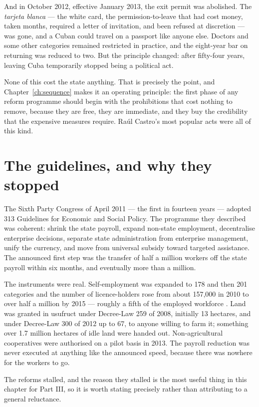 And in October 2012, effective January 2013, the exit permit was abolished. The
\emph{tarjeta blanca} --- the white card, the permission-to-leave that had cost
money, taken months, required a letter of invitation, and been refused at
discretion --- was gone, and a Cuban could travel on a passport like anyone
else. Doctors and some other categories remained restricted in practice, and the
eight-year bar on returning was reduced to two. But the principle changed: after
fifty-four years, leaving Cuba temporarily stopped being a political act.

None of this cost the state anything. That is precisely the point, and
Chapter~\ref{ch:sequence} makes it an operating principle: the first phase of
any reform programme should begin with the prohibitions that cost nothing to
remove, because they are free, they are immediate, and they buy the credibility
that the expensive measures require. Ra\'ul Castro's most popular acts were all
of this kind.

\section{The guidelines, and why they stopped}

The Sixth Party Congress of April 2011 --- the first in fourteen years ---
adopted 313 Guidelines for Economic and Social Policy. The programme they
described was coherent: shrink the state payroll, expand non-state employment,
decentralise enterprise decisions, separate state administration from enterprise
management, unify the currency, and move from universal subsidy toward targeted
assistance. The announced first step was the transfer of half a million workers
off the state payroll within six months, and eventually more than a million.

The instruments were real. Self-employment was expanded to 178 and then 201
categories and the number of licence-holders rose from about 157,000 in 2010 to
over half a million by 2015 --- roughly a fifth of the employed
workforce \citep{ritter2015}.\unv{} Land was granted in usufruct under Decree-Law 259 of 2008,
initially 13 hectares, and under Decree-Law 300 of 2012 up to 67, to anyone
willing to farm it; something over 1.7 million hectares of idle land were handed
out.\unv{} Non-agricultural cooperatives were authorised on a pilot basis in
2013. The payroll reduction was never executed at anything like the announced
speed, because there was nowhere for the workers to go.

The reforms stalled, and the reason they stalled is the most useful thing in
this chapter for Part III, so it is worth stating precisely rather than
attributing to a general reluctance.

